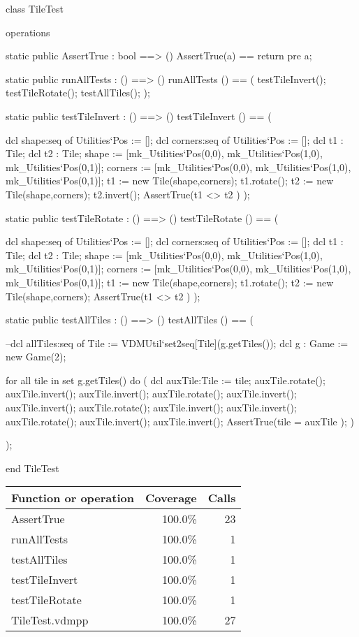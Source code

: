 \begin{vdm_al}
class TileTest

 operations
 
  static public AssertTrue : bool ==> ()
   AssertTrue(a) == return
     pre a;
     
  static public runAllTests : () ==> ()
  runAllTests () == (
   testTileInvert();
   testTileRotate();
   testAllTiles();
  );
  
  static public testTileInvert : () ==> ()
  testTileInvert () == (
  
   dcl shape:seq of Utilities`Pos := [];
      dcl corners:seq of Utilities`Pos := [];
      dcl t1 : Tile;
      dcl t2 : Tile;
   shape := [mk_Utilities`Pos(0,0), mk_Utilities`Pos(1,0), mk_Utilities`Pos(0,1)];
      corners := [mk_Utilities`Pos(0,0), mk_Utilities`Pos(1,0), mk_Utilities`Pos(0,1)];
   t1 := new Tile(shape,corners);
   t1.rotate();
   t2 := new Tile(shape,corners);
   t2.invert();
   AssertTrue(t1 <> t2 )
  );
  
  static public testTileRotate : () ==> ()
  testTileRotate () == (
  
   dcl shape:seq of Utilities`Pos := [];
      dcl corners:seq of Utilities`Pos := [];
      dcl t1 : Tile;
      dcl t2 : Tile;
   shape := [mk_Utilities`Pos(0,0), mk_Utilities`Pos(1,0), mk_Utilities`Pos(0,1)];
      corners := [mk_Utilities`Pos(0,0), mk_Utilities`Pos(1,0), mk_Utilities`Pos(0,1)];
   t1 := new Tile(shape,corners);
   t1.rotate();
   t2 := new Tile(shape,corners);
   AssertTrue(t1 <> t2 )
  );
  
  static public testAllTiles : () ==> ()
  testAllTiles () == (
  
   --dcl allTiles:seq of Tile := VDMUtil`set2seq[Tile](g.getTiles());
   dcl g : Game := new Game(2);
   
   for all tile in set g.getTiles() do (
    dcl auxTile:Tile := tile;
    auxTile.rotate();
    auxTile.invert();
    auxTile.invert();
    auxTile.rotate();
    auxTile.invert();
    auxTile.invert();
    auxTile.rotate();
    auxTile.invert();
    auxTile.invert();
    auxTile.rotate();
    auxTile.invert();
    auxTile.invert();
    AssertTrue(tile = auxTile );
   )
   
  );

end TileTest
\end{vdm_al}
\bigskip
\begin{longtable}{|l|r|r|}
\hline
Function or operation & Coverage & Calls \\
\hline
\hline
AssertTrue & 100.0\% & 23 \\
\hline
runAllTests & 100.0\% & 1 \\
\hline
testAllTiles & 100.0\% & 1 \\
\hline
testTileInvert & 100.0\% & 1 \\
\hline
testTileRotate & 100.0\% & 1 \\
\hline
\hline
TileTest.vdmpp & 100.0\% & 27 \\
\hline
\end{longtable}

